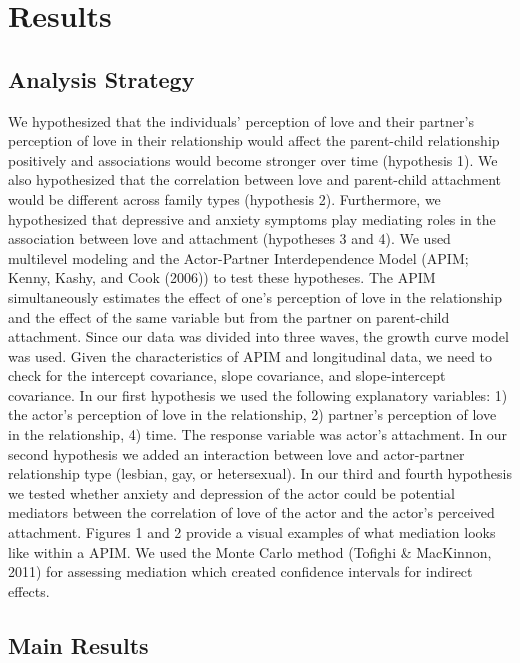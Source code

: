\documentclass[man]{apa6}
\begin{document}
\hypertarget{results}{%
\section{Results}\label{results}}

\hypertarget{analysis-strategy}{%
\subsection{Analysis Strategy}\label{analysis-strategy}}

We hypothesized that the individuals' perception of love and their partner's perception of love in their relationship would affect the parent-child relationship positively and associations would become stronger over time (hypothesis 1). We also hypothesized that the correlation between love and parent-child attachment would be different across family types (hypothesis 2). Furthermore, we hypothesized that depressive and anxiety symptoms play mediating roles in the association between love and attachment (hypotheses 3 and 4). We used multilevel modeling and the Actor-Partner Interdependence Model (APIM; Kenny, Kashy, and Cook (2006)) to test these hypotheses. The APIM simultaneously estimates the effect of one's perception of love in the relationship and the effect of the same variable but from the partner on parent-child attachment. Since our data was divided into three waves, the growth curve model was used. Given the characteristics of APIM and longitudinal data, we need to check for the intercept covariance, slope covariance, and slope-intercept covariance.
In our first hypothesis we used the following explanatory variables: 1) the actor's perception of love in the relationship, 2) partner's perception of love in the relationship, 4) time. The response variable was actor's attachment. In our second hypothesis we added an interaction between love and actor-partner relationship type (lesbian, gay, or hetersexual).
In our third and fourth hypothesis we tested whether anxiety and depression of the actor could be potential mediators between the correlation of love of the actor and the actor's perceived attachment. Figures 1 and 2 provide a visual examples of what mediation looks like within a APIM. We used the Monte Carlo method (Tofighi \& MacKinnon, 2011) for assessing mediation which created confidence intervals for indirect effects.

\hypertarget{main-results}{%
\subsection{Main Results}\label{main-results}}
\end{document}
